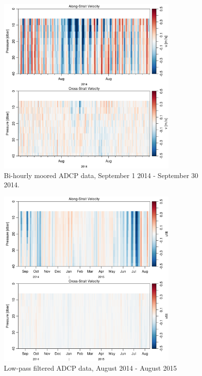 \documentclass[12pt]{dforeport}
\begin{document}
\begin{figure}  
\centering
\includegraphics[width = 0.8\textwidth]{./figures/15_madcp_2014.png}
\caption[Bi-hourly ADCP data, Sept. 1 - Sept 30, 2014]{Bi-hourly moored ADCP data, September 1 2014 - September 30 2014.}
\label{f:madcp_sept2014}
\end{figure}


\begin{figure}  
\centering
\includegraphics[width = 0.8\textwidth]{./figures/17_madcp_lpf_2014_2015.png}
\caption[Low-pass filtered ADCP data, 2014-2015]{Low-pass filtered ADCP data, August 2014 - August 2015}
\label{f:madcp_lpf_2014_2015}
\end{figure}
\end{document}
